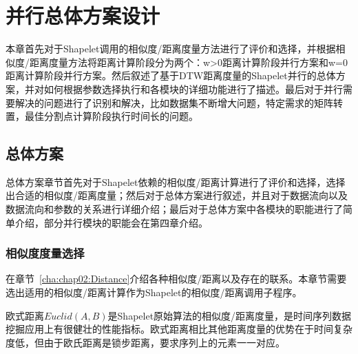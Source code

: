 \chapter{并行总体方案设计}
\label{cha:chap03}



本章首先对于Shapelet调用的相似度/距离度量方法进行了评价和选择，并根据相似度/距离度量方法将距离计算阶段分为两个：w>0距离计算阶段并行方案和w=0距离计算阶段并行方案。然后叙述了基于DTW距离度量的Shapelet并行的总体方案，并对如何根据参数选择执行和各模块的详细功能进行了描述。最后对于并行需要解决的问题进行了识别和解决，比如数据集不断增大问题，特定需求的矩阵转置，最佳分割点计算阶段执行时间长的问题。



\section{总体方案}
\label{cha:chap04:myalg:Overview}

总体方案章节首先对于Shapelet依赖的相似度/距离计算进行了评价和选择，选择出合适的相似度/距离度量；然后对于总体方案进行叙述，并且对于数据流向以及数据流向和参数的关系进行详细介绍；最后对于总体方案中各模块的职能进行了简单介绍，部分并行模块的职能会在第四章介绍。


\subsection{相似度度量选择}

在章节~\ref{cha:chap02:Distance}介绍各种相似度/距离以及存在的联系。本章节需要选出适用的相似度/距离计算作为Shapelet的相似度/距离调用子程序。

欧式距离$Euclid(A,B)$是Shapelet原始算法的相似度/距离度量，是时间序列数据挖掘应用上有很健壮的性能指标。欧式距离相比其他距离度量的优势在于时间复杂度低，但由于欧氏距离是锁步距离，要求序列上的元素一一对应。

